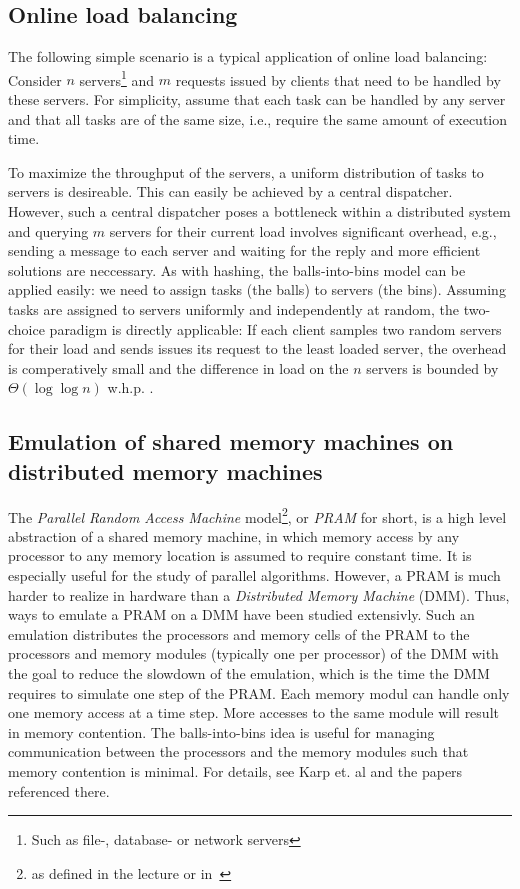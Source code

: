\documentclass[a4paper,12pt]{article}
\begin{document}
\subsection{Online load balancing}
\label{sec:loadbalancing}
The following simple scenario is a typical application of online load balancing: Consider $n$ servers\footnote{Such as file-, database- or network servers} and $m$ requests issued by clients that need to be handled by these servers. For simplicity, assume that each task can be handled by any server and that all tasks are of the same size, i.e., require the same amount of execution time.

To maximize the throughput of the servers, a uniform distribution of tasks to servers is desireable. This can easily be achieved by a central dispatcher. However, such a central dispatcher poses a bottleneck within a distributed system and querying $m$ servers for their current load involves significant overhead, e.g., sending a message to each server and waiting for the reply and more efficient solutions are neccessary. As with hashing, the balls-into-bins model can be applied easily: we need to assign tasks (the balls) to servers (the bins). Assuming tasks are assigned to servers uniformly and independently at random, the two-choice paradigm is directly applicable: If each client samples two random servers for their load and sends issues its request to the least loaded server, the overhead is comperatively small and the difference in load on the $n$ servers is bounded by $\Theta\left(\log \log n\right)$ w.h.p. \cite{KLM92} \cite{RS98} \cite{MRS01}.  

\subsection{Emulation of shared memory machines on distributed memory machines}
\label{sec:DMM}
The \emph{Parallel Random Access Machine} model\footnote{as defined in the lecture or in~\cite{P03}}, or \emph{PRAM} for short, is a high level abstraction of a shared memory machine, in which memory access by any processor to any memory location is assumed to require constant time. It is especially useful for the study of parallel algorithms. However, a PRAM is much harder to realize in hardware than a \emph{Distributed Memory Machine} (DMM). Thus, ways to emulate a PRAM on a DMM have been studied extensivly. Such an emulation distributes the processors and memory cells of the PRAM to the processors and memory modules (typically one per processor) of the DMM with the goal to reduce the slowdown of the emulation, which is the time the DMM requires to simulate one step of the PRAM. Each memory modul can handle only one memory access at a time step. More accesses to the same module will result in memory contention. The balls-into-bins idea is useful for managing communication between the processors and the memory modules such that memory contention is minimal. For details, see Karp et. al \cite{KLM92} and the papers referenced there. 
 
\end{document}
